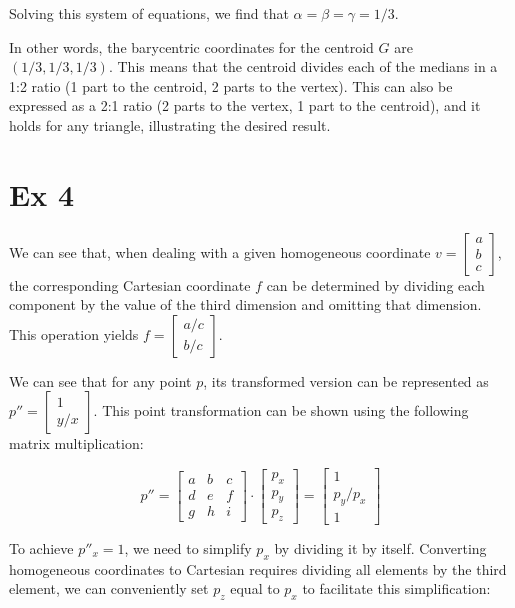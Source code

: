 \documentclass{article}
\begin{document}
Solving this system of equations, we find that $\alpha = \beta = \gamma = 1/3$.

In other words, the barycentric coordinates for the centroid $G$ are $\left(1/3, 1/3, 1/3\right)$. This means that the centroid divides each of the medians in a 1:2 ratio (1 part to the centroid, 2 parts to the vertex). This can also be expressed as a 2:1 ratio (2 parts to the vertex, 1 part to the centroid), and it holds for any triangle, illustrating the desired result.





\section*{Ex 4}
We can see that, when dealing with a given homogeneous coordinate $v = \begin{bmatrix} a \\ b \\ c \end{bmatrix}$, the corresponding Cartesian coordinate $f$ can be determined by dividing each component by the value of the third dimension and omitting that dimension. This operation yields $f = \begin{bmatrix} a/c \\ b/c \end{bmatrix}$.

We can see that for any point $p$, its transformed version can be represented as $p'' = \begin{bmatrix} 1 \\ y/x \end{bmatrix}$. This point transformation can be shown using the following matrix multiplication:

\[
    p'' = \begin{bmatrix} a & b & c \\ d & e & f \\ g & h & i \end{bmatrix} \cdot \begin{bmatrix} p_x \\ p_y \\ p_z \end{bmatrix} = \begin{bmatrix} 1 \\ p_y/p_x \\ 1 \end{bmatrix}
\]

To achieve $p''_x = 1$, we need to simplify $p_x$ by dividing it by itself. Converting homogeneous coordinates to Cartesian requires dividing all elements by the third element, we can conveniently set $p_z$ equal to $p_x$ to facilitate this simplification:
\end{document}
